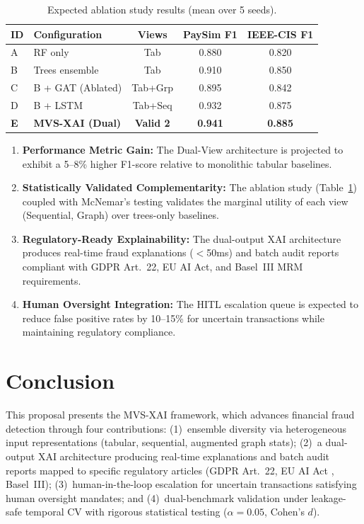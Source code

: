 \documentclass[10pt,a4paper,twocolumn]{article}
\begin{document}
\begin{table}[H]
\centering
\caption{Expected ablation study results (mean over 5 seeds).}
\label{tab:expected}
{\footnotesize
\begin{tabularx}{\linewidth}{@{}lXccc@{}}
\toprule
\textbf{ID} & \textbf{Configuration} & \textbf{Views} & \textbf{PaySim F1} & \textbf{IEEE-CIS F1} \\
\midrule
A & RF only          & Tab      & 0.880 & 0.820 \\
B & Trees ensemble   & Tab      & 0.910 & 0.850 \\
C & B + GAT (Ablated)& Tab+Grp  & 0.895 & 0.842 \\
D & B + LSTM         & Tab+Seq  & 0.932 & 0.875 \\
\textbf{E} & \textbf{MVS-XAI (Dual)} & \textbf{Valid 2} & \textbf{0.941} & \textbf{0.885} \\
\bottomrule
\end{tabularx}
}
\end{table}

\begin{enumerate}
    \item \textbf{Performance Metric Gain:} The Dual-View architecture is projected to exhibit a 5--8\% higher F1-score relative to monolithic tabular baselines.
    \item \textbf{Statistically Validated Complementarity:} The ablation study (Table~\ref{tab:expected}) coupled with McNemar's testing validates the marginal utility of each view (Sequential, Graph) over trees-only baselines.
    \item \textbf{Regulatory-Ready Explainability:} The dual-output XAI architecture produces real-time fraud explanations ($<$50ms) and batch audit reports compliant with GDPR Art.~22, EU AI Act, and Basel~III MRM requirements.
    \item \textbf{Human Oversight Integration:} The HITL escalation queue is expected to reduce false positive rates by 10--15\% for uncertain transactions while maintaining regulatory compliance.
\end{enumerate}

\section{Conclusion}
This proposal presents the MVS-XAI framework, which advances financial fraud detection through four contributions: (1)~ensemble diversity via heterogeneous input representations (tabular, sequential, augmented graph stats); (2)~a dual-output XAI architecture producing real-time explanations and batch audit reports mapped to specific regulatory articles (GDPR Art.~22, EU AI Act \cite{euaiact2024}, Basel~III); (3)~human-in-the-loop escalation for uncertain transactions satisfying human oversight mandates; and (4)~dual-benchmark validation under leakage-safe temporal CV with rigorous statistical testing ($\alpha{=}0.05$, Cohen's $d$).
\end{document}

